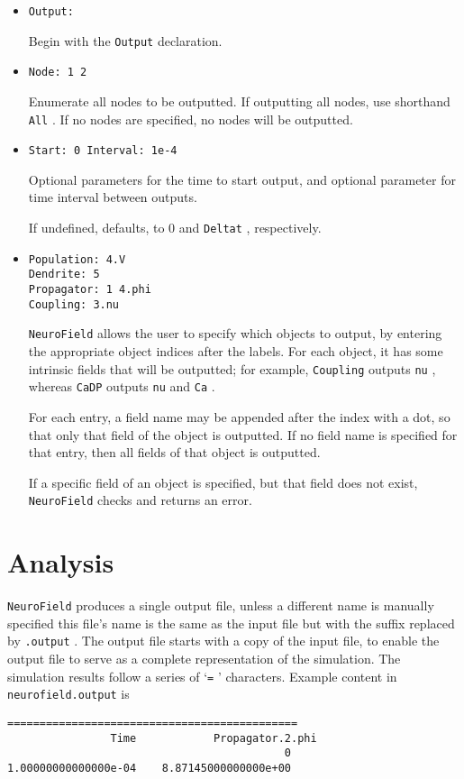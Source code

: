 \documentclass[12pt,a4paper]{article}
\newcommand{\type}[1]{{\small\small\tt #1} }
\newcommand{\NF}[0]{\type{NeuroField}}
\begin{document}
\begin{itemize}
    \item \begin{lstlisting}
Output:
        \end{lstlisting}
Begin with the \type{Output} declaration.
\item \begin{lstlisting}
Node: 1 2
\end{lstlisting}
Enumerate all nodes to be outputted. If outputting all nodes, use shorthand \type{All}. If no nodes are specified, no nodes will be outputted.
\item \begin{lstlisting}
Start: 0 Interval: 1e-4
\end{lstlisting}
Optional parameters for the time to start output, and optional parameter for time interval between outputs.

If undefined, defaults, to 0 and \type{Deltat}, respectively.
\item \begin{lstlisting}
Population: 4.V
Dendrite: 5
Propagator: 1 4.phi
Coupling: 3.nu
\end{lstlisting}

\NF allows the user to specify which objects to output, by entering the appropriate object indices after the labels. For each object, it has some intrinsic fields that will be outputted; for example, \type{Coupling} outputs \type{nu}, whereas \type{CaDP} outputs \type{nu} and \type{Ca}.

For each entry, a field name may be appended after the index with a dot, so that only that field of the object is outputted. If no field name is specified for that entry, then all fields of that object is outputted.

If a specific field of an object is specified, but that field does not exist, \NF checks and returns an error.

\end{itemize}

\section{Analysis}
\label{sec:analysis}

\NF produces a single output file, unless a different name is manually specified this file's name is the same as the input file but with the suffix replaced by \type{.output}. The output file starts with a copy of the input file, to enable the output file to serve as a complete representation of the simulation. The simulation results follow a series of `\type{=}' characters. Example content in \type{neurofield.output} is
\begin{lstlisting}
=============================================
                Time            Propagator.2.phi
                                           0
1.00000000000000e-04    8.87145000000000e+00
\end{lstlisting}
\end{document}
